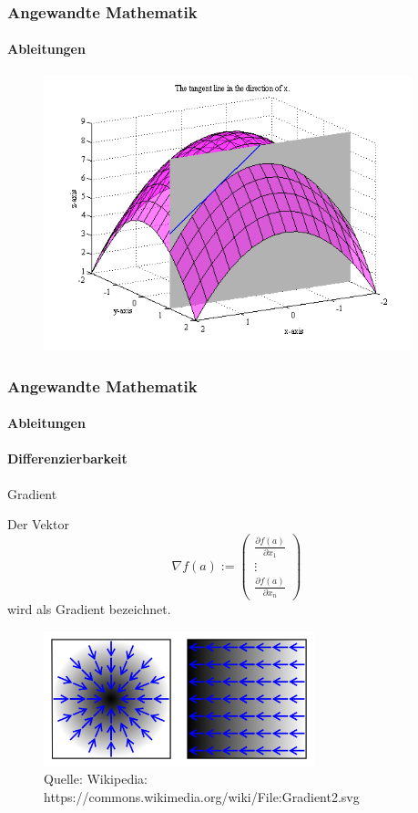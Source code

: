 \documentclass{beamer}
\begin{document}
    \begin{frame}
        \frametitle{Angewandte Mathematik}
        \framesubtitle{Ableitungen}  
    
    \begin{figure}[H]
          \centering
        \includegraphics[width=0.95\textwidth]{images/diffable}
    \end{figure}
    
     \end{frame}





     \begin{frame}
        \frametitle{Angewandte Mathematik}
        \framesubtitle{Ableitungen}

    \framesubtitle{Differenzierbarkeit}
        \begin{block}{Gradient}
    
    Der Vektor 
    $$\nabla f (a) := \begin{pmatrix}  \frac{\partial f(a)}{\partial x_1} \\  \vdots \\ \frac{\partial f(a)}{\partial x_n}  \end{pmatrix}$$
    wird als Gradient bezeichnet. 
    \end{block}
    \begin{figure}[H]
          \centering
        \includegraphics[width=0.7\textwidth]{images/Gradient}
          \caption{Quelle: Wikipedia: https://commons.wikimedia.org/wiki/File:Gradient2.svg}
    \end{figure}
    
    
     \end{frame}
    
\end{document}
